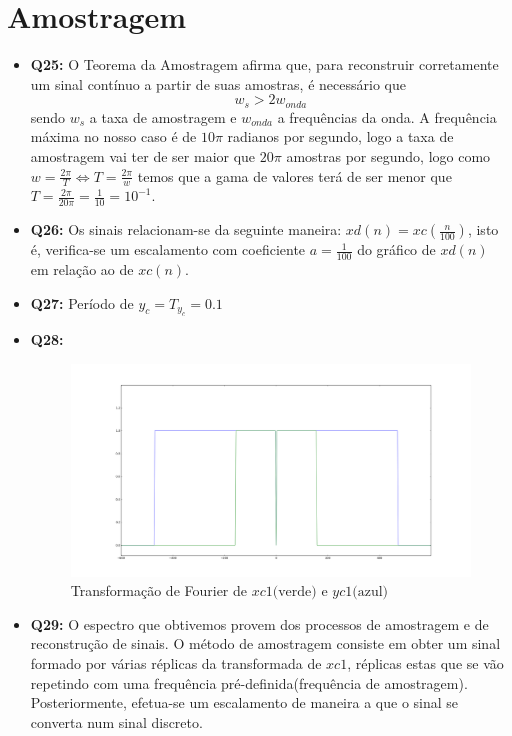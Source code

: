 \documentclass[a4paper, 12pt]{article}
\begin{document}
\section{Amostragem}
\begin{itemize}
    \item \textbf{Q25:} O Teorema da Amostragem afirma que, para reconstruir corretamente um sinal contínuo a partir de suas amostras, é necessário que
          \[w_s > 2w_{onda}\]
          sendo $w_s$ a taxa de amostragem e $w_{onda}$ a frequências da onda.
          A frequência máxima no nosso caso é de $10\pi$ radianos por segundo, logo a taxa de amostragem vai ter de ser maior que $20\pi$ amostras por segundo, logo como $w = \frac{2\pi}{T} \Leftrightarrow T = \frac{2\pi}{w}$ temos que a gama de valores terá de ser menor que $T = \frac{2\pi}{20\pi} = \frac{1}{10} = 10^{-1}$.
    \item \textbf{Q26:} Os sinais relacionam-se da seguinte maneira: $xd(n) = xc\left(\frac{n}{100}\right)$, isto é, verifica-se um escalamento com coeficiente $a = \frac{1}{100}$ do gráfico de $xd(n)$ em relação ao de $xc(n)$.
    \item \textbf{Q27:} Período de $y_{c} = T_{y_c} = 0.1$
    \item \textbf{Q28:}
          \begin{figure}[!ht]
              \includegraphics[width = 13.5cm]{images/Graf6.png}
              \vspace{-15px}
              \caption{Transformação de Fourier de $xc1 \textrm{(verde) e } yc1 \textrm{(azul)}$}
          \end{figure}
          \newpage
    \item \textbf{Q29:} O espectro que obtivemos provem dos processos de amostragem e de reconstrução de sinais. O método de amostragem consiste em obter um sinal formado por várias réplicas da transformada de $xc1$, réplicas estas que se vão repetindo com uma frequência pré-definida(frequência de amostragem). Posteriormente, efetua-se um escalamento de maneira a que o sinal se converta num sinal discreto.\\

\end{itemize}
\end{document}
